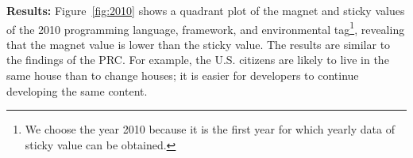 \documentclass[conference]{IEEEtran}
\begin{document}





\noindent \textbf{Results:}
Figure~\ref{fig:2010} shows a quadrant plot of the magnet and sticky values ​​of the 2010 programming language, framework, and environmental tag\footnote{We choose the year 2010 because it is the first year for which yearly data of sticky value can be obtained.}, revealing that the magnet value is lower than the sticky value. The results are similar to the findings of the PRC. For example, the U.S. citizens are likely to live in the same house than to change houses; it is easier for developers to continue developing the same content.
 
\end{document}
